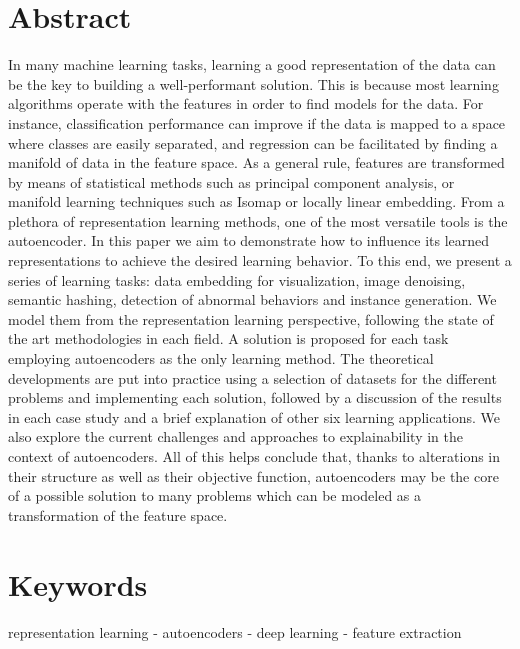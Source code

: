 \setchapterpreamble[u]{\margintoc}
\newcommand{\revision}[1]{#1}
\newcommand{\revisioncolor}{}

\label{ch:paper5}

\section*{Abstract}
In many machine learning tasks, learning a good representation of the data can be the key to building a well-performant solution. This is because most learning algorithms operate with the features in order to find models for the data. For instance, classification performance can improve if the data is mapped to a space where classes are easily separated, and regression can be facilitated by finding a manifold of data in the feature space. As a general rule, features are transformed by means of statistical methods such as principal component analysis, or manifold learning techniques such as Isomap or locally linear embedding. From a plethora of representation learning methods, one of the most versatile tools is the autoencoder. In this paper we aim to demonstrate how to influence its learned representations to achieve the desired learning behavior. To this end, we present a series of learning tasks: data embedding for visualization, image denoising, semantic hashing, detection of abnormal behaviors and instance generation. We model them from the representation learning perspective, following the state of the art methodologies in each field. A solution is proposed for each task employing autoencoders as the only learning method. The theoretical developments are put into practice using a selection of datasets for the different problems and implementing each solution, followed by a discussion of the results in each case study {and a brief explanation of other six learning applications. We also explore the current challenges and approaches to explainability in the context of autoencoders.} All of this helps conclude that, thanks to alterations in their structure as well as their objective function, autoencoders may be the core of a possible solution to many problems which can be modeled as a transformation of the feature space.

  \section*{Keywords}
representation learning -  autoencoders - deep learning - feature extraction

